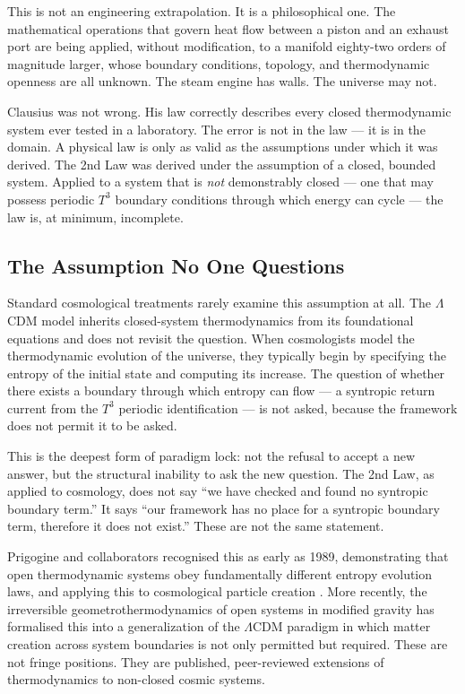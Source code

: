 \documentclass[aps,prd,11pt,onecolumn,superscriptaddress,nofootinbib,floatfix]{revtex4-2}
\begin{document}
This is not an engineering extrapolation. It is a philosophical one. The mathematical operations that govern heat flow between a piston and an exhaust port are being applied, without modification, to a manifold eighty-two orders of magnitude larger, whose boundary conditions, topology, and thermodynamic openness are all unknown. The steam engine has walls. The universe may not.

Clausius was not wrong. His law correctly describes every closed thermodynamic system ever tested in a laboratory. The error is not in the law --- it is in the domain. A physical law is only as valid as the assumptions under which it was derived. The 2nd Law was derived under the assumption of a closed, bounded system. Applied to a system that is \textit{not} demonstrably closed --- one that may possess periodic $T^3$ boundary conditions through which energy can cycle --- the law is, at minimum, incomplete.

\subsection{The Assumption No One Questions}

Standard cosmological treatments rarely examine this assumption at all. The $\Lambda$CDM model inherits closed-system thermodynamics from its foundational equations and does not revisit the question. When cosmologists model the thermodynamic evolution of the universe, they typically begin by specifying the entropy of the initial state and computing its increase. The question of whether there exists a boundary through which entropy can flow --- a syntropic return current from the $T^3$ periodic identification --- is not asked, because the framework does not permit it to be asked.

This is the deepest form of paradigm lock: not the refusal to accept a new answer, but the structural inability to ask the new question. The 2nd Law, as applied to cosmology, does not say ``we have checked and found no syntropic boundary term.'' It says ``our framework has no place for a syntropic boundary term, therefore it does not exist.'' These are not the same statement.

Prigogine and collaborators recognised this as early as 1989, demonstrating that open thermodynamic systems obey fundamentally different entropy evolution laws, and applying this to cosmological particle creation \cite{prigogine_1989}. More recently, the irreversible geometrothermodynamics of open systems in modified gravity \cite{open_systems_2023} has formalised this into a generalization of the $\Lambda$CDM paradigm in which matter creation across system boundaries is not only permitted but required. These are not fringe positions. They are published, peer-reviewed extensions of thermodynamics to non-closed cosmic systems.
\end{document}
